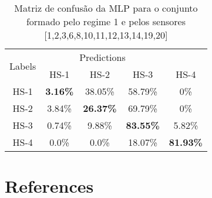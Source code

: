 \documentclass[review]{elsarticle}
\begin{document}
\begin{table}[!htb]
\centering
\caption{Matriz de confusão da MLP para o conjunto formado pelo regime 1 e pelos sensores [1,2,3,6,8,10,11,12,13,14,19,20]}
\begin{tabular}{c|cccc}
\toprule
%         
\hline
\multirow{2}{*}{Labels} & \multicolumn{3}{c}{Predictions} \\ 
\cline{2-5}
                 & HS-1 & HS-2 & HS-3 & HS-4 \\ \hline            
HS-1 & \textbf{3.16\% } & 38.05\% & 58.79\% & 0\%   \\
HS-2 & 3.84\% & \textbf{26.37\%} & 69.79\% & 0\%   \\
HS-3 & 0.74\% & 9.88\%  & \textbf{83.55\%} & 5.82\%   \\
HS-4 & 0.0\%  & 0.0\%   & 18.07\% & \textbf{81.93\%}  \\
\hline
\bottomrule
\end{tabular}
\label{tab:tabela_de_confusao}
\end{table}






\section*{References}


\end{document}
